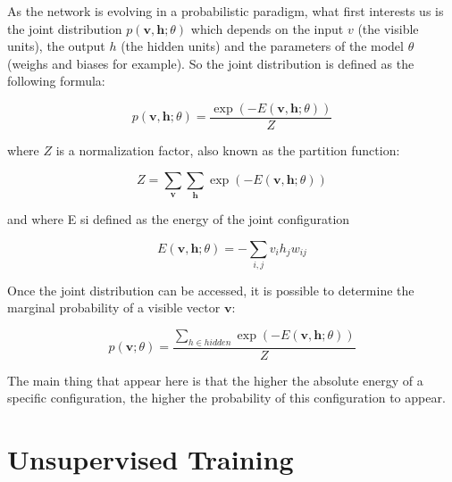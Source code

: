 \documentclass{report}
\begin{document}
	As the network is evolving in a probabilistic paradigm, what first interests us 
	is the joint distribution $p(\textbf{v}, \textbf{h}; \theta )$ which depends on the 
	input $v$ (the visible units), the output $h$ (the hidden units) and the parameters 
	of the model $\theta$ (weighs and biases for example). So the joint distribution 
	is defined as the following formula:
	
	\vspace{0.5cm}
	\begin{equation} p (\textbf{v}, \textbf{h}; \theta )
	= \frac{\exp (-E (\textbf{v}, \textbf{h}; \theta))}{Z}
	\end{equation}
	\vspace{0.5cm}
	
	where $Z$ is a normalization factor, also known as the partition function:
	
	\vspace{0.5cm}
	\begin{equation}
	Z = \sum_{\textbf{v}}\sum_{\textbf{h}}\exp (-E(\textbf{v}, \textbf{h}; \theta))
	\end{equation}
	\vspace{0.5cm}	
		
	and where E si defined as the energy of the joint configuration
	
	\vspace{0.5cm}
	\begin{equation}
	E(\textbf{v}, \textbf{h}; \theta) = - \sum_{i,j}v_ih_jw_{ij}
	\end{equation}
	\vspace{0.5cm}
	
	Once the joint distribution can be accessed, it is possible to determine the
	marginal probability of a visible vector $\textbf{v}$:
	
	\vspace{0.5cm}
	\begin{equation}
	p (\textbf{v}; \theta ) =\frac{\sum_{h \in hidden} \exp (-E (\textbf{v}, \textbf{h}; \theta))}{Z}
	\end{equation}
	\vspace{0.5cm}
	
	The main thing that appear here is that the higher the absolute energy of a specific configuration, the higher the probability of this configuration to appear.
	
	\section{Unsupervised Training}
	
\end{document}
